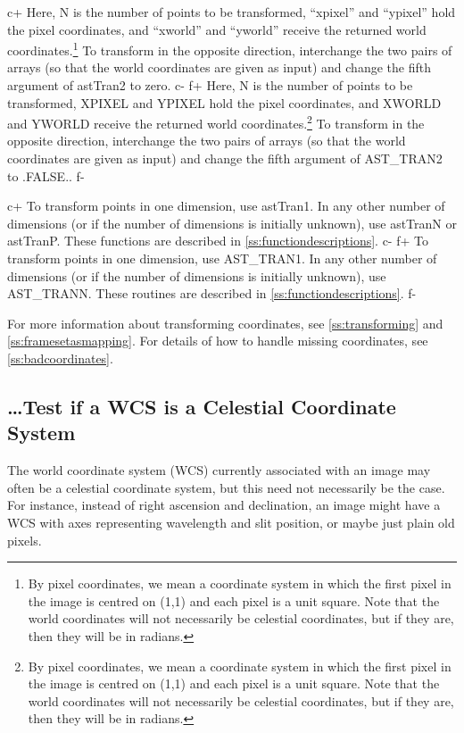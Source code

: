 \documentclass[twoside,11pt]{article}
\newcommand{\appref}[1]{Appendix~\ref{#1}}
\newcommand{\secref}[1]{\S\ref{#1}}
\renewcommand{\appref}[1]{\ref{#1}}
\renewcommand{\secref}[1]{\ref{#1}}
\begin{document}
c+
Here, N is the number of points to be transformed, ``xpixel'' and
``ypixel'' hold the pixel coordinates, and ``xworld'' and ``yworld''
receive the returned world coordinates.\footnote{By pixel coordinates,
we mean a coordinate system in which the first pixel in the image is
centred on (1,1) and each pixel is a unit square.  Note that the world
coordinates will not necessarily be celestial coordinates, but if they
are, then they will be in radians.}  To transform in the opposite
direction, interchange the two pairs of arrays (so that the world
coordinates are given as input) and change the fifth argument of
astTran2 to zero.
c-
f+
Here, N is the number of points to be transformed, XPIXEL and YPIXEL
hold the pixel coordinates, and XWORLD and YWORLD receive the returned
world coordinates.\footnote{By pixel coordinates, we mean a coordinate
system in which the first pixel in the image is centred on (1,1) and
each pixel is a unit square.  Note that the world coordinates will not
necessarily be celestial coordinates, but if they are, then they will
be in radians.}  To transform in the opposite direction, interchange
the two pairs of arrays (so that the world coordinates are given as
input) and change the fifth argument of AST\_TRAN2 to .FALSE..
f-

c+
To transform points in one dimension, use astTran1. In any other
number of dimensions (or if the number of dimensions is initially
unknown), use astTranN or astTranP. These functions are described in
\appref{ss:functiondescriptions}.
c-
f+
To transform points in one dimension, use AST\_TRAN1. In any other
number of dimensions (or if the number of dimensions is initially
unknown), use AST\_TRANN. These routines are described in
\appref{ss:functiondescriptions}.
f-

For more information about transforming coordinates, see
\secref{ss:transforming} and \secref{ss:framesetasmapping}. For
details of how to handle missing coordinates, see
\secref{ss:badcoordinates}.

\subsection{\label{ss:howtotestforcelestial}\ldots Test if a WCS is a Celestial Coordinate System}

The world coordinate system (WCS) currently associated with an image
may often be a celestial coordinate system, but this need not
necessarily be the case. For instance, instead of right ascension and
declination, an image might have a WCS with axes representing
wavelength and slit position, or maybe just plain old pixels.
\end{document}
